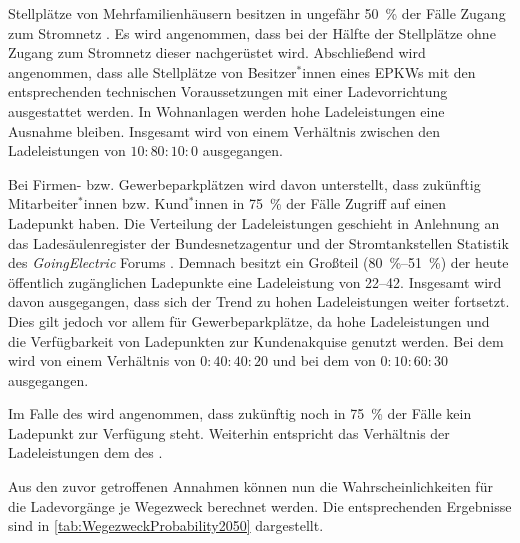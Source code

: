 Stellplätze von Mehrfamilienhäusern besitzen in ungefähr \SI{50}{\percent} der Fälle Zugang zum Stromnetz \cite{dena2020}.
Es wird angenommen, dass bei der Hälfte der Stellplätze ohne Zugang zum Stromnetz dieser nachgerüstet wird.
Abschließend wird angenommen, dass alle Stellplätze von Besitzer$^*$innen eines \glspl{EPKW} mit den entsprechenden technischen Voraussetzungen mit einer Ladevorrichtung ausgestattet werden.
In Wohnanlagen werden hohe Ladeleistungen eine Ausnahme bleiben.
Insgesamt wird von einem Verhältnis zwischen den Ladeleistungen von \(10:80:10:0\) ausgegangen.\medskip

Bei Firmen- bzw. Gewerbeparkplätzen wird davon unterstellt, dass zukünftig Mitarbeiter$^*$innen bzw. Kund$^*$innen in \SI{75}{\percent} der Fälle Zugriff auf einen Ladepunkt haben.
Die Verteilung der Ladeleistungen geschieht in Anlehnung an das Ladesäulenregister der Bundesnetzagentur \cite[][Stand: ]{BundesnetzagenturElektrizitaet2020} und der Stromtankstellen Statistik des \textit{GoingElectric} Forums \cite[][Stand: ]{Weemaes2020}.
Demnach besitzt ein Großteil (\SIrange[range-phrase=~bzw.~]{80}{51}{\percent}) der heute öffentlich zugänglichen Ladepunkte eine Ladeleistung von \SIrange{22}{42}{\kw}.
Insgesamt wird davon ausgegangen, dass sich der Trend zu hohen Ladeleistungen weiter fortsetzt.
Dies gilt jedoch vor allem für Gewerbeparkplätze, da hohe Ladeleistungen und die Verfügbarkeit von Ladepunkten zur Kundenakquise genutzt werden.
Bei dem \UC \Firmeparkplatz wird von einem Verhältnis von \(0:40:40:20\) und bei dem \UC \Gewerbeparkplatz von \(0:10:60:30\) ausgegangen.\medskip

Im Falle des \UC \Straszenrand wird angenommen, dass zukünftig noch in \SI{75}{\percent} der Fälle kein Ladepunkt zur Verfügung steht.
Weiterhin entspricht das Verhältnis der Ladeleistungen dem des \UC \Firmeparkplatzdot.\medskip

Aus den zuvor getroffenen Annahmen können nun die Wahrscheinlichkeiten für die Ladevorgänge je Wegezweck berechnet werden.
Die entsprechenden Ergebnisse sind in \autoref{tab:WegezweckProbability2050} dargestellt.




